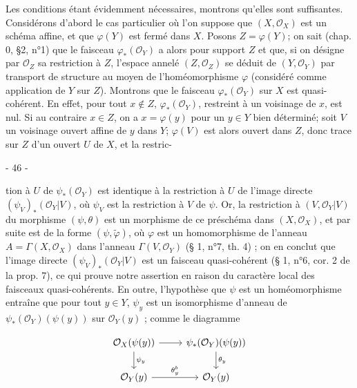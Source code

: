 Les conditions étant évidemment nécessaires, montrons qu'elles sont suffisantes. Considérons d'abord le cas particulier où l'on suppose que $(X, \mathcal{O}_X)$ est un schéma affine, et que $\varphi(Y)$ est fermé dans $X$. Posons $Z = \varphi(Y)$; on sait (chap. 0, §2, n°1) que le faisceau $\varphi_*(\mathcal{O}_Y)$ a alors pour support $Z$ et que, si on désigne par $\mathcal{O}_Z$ sa restriction à $Z$, l'espace annelé $(Z, \mathcal{O}_Z)$ se déduit de $(Y, \mathcal{O}_Y)$ par transport de structure au moyen de l'homéomorphisme $\varphi$ (considéré comme application de $Y$ sur $Z$). Montrons que le faisceau $\varphi_*(\mathcal{O}_Y)$ sur $X$ est quasi-cohérent. En effet, pour tout $x \notin Z$, $\varphi_*(\mathcal{O}_Y)$, restreint à un voisinage de $x$, est nul. Si au contraire $x \in Z$, on a $x = \varphi(y)$ pour un $y \in Y$ bien déterminé; soit $V$ un voisinage ouvert affine de $y$ dans $Y$; $\varphi(V)$ est alors ouvert dans $Z$, donc trace sur $Z$ d'un ouvert $U$ de $X$, et la restric-

\newpage


- 46 -

tion à $U$ de $\psi_*(\mathcal{O}_Y)$ est identique à la restriction à $U$ de l'image directe $(\psi_V)_*(\mathcal{O}_Y|V)$, où $\psi_V$ est la restriction à $V$ de $\psi$. Or, la restriction à $(V, \mathcal{O}_Y|V)$ du morphisme $(\psi, \theta)$ est un morphisme de ce préschéma dans $(X, \mathcal{O}_X)$, et par suite est de la forme $(\psi, \tilde{\varphi})$, où $\varphi$ est un homomorphisme de l'anneau $A = \Gamma(X, \mathcal{O}_X)$ dans l'anneau $\Gamma(V, \mathcal{O}_Y)$ (§ 1, n°7, th. 4) ; on en conclut que l'image directe $(\psi_V)_*(\mathcal{O}_Y|V)$ est un faisceau quasi-cohérent (§ 1, n°6, cor. 2 de la prop. 7), ce qui prouve notre assertion en raison du caractère local des faisceaux quasi-cohérents. En outre, l'hypothèse que $\psi$ est un homéomorphisme entraîne que pour tout $y \in Y$, $\psi_y$ est un isomorphisme d'anneau de $\psi_*(\mathcal{O}_Y)(\psi(y))$ sur $\mathcal{O}_Y(y)$ ; comme le diagramme

$$\begin{tikzcd}
\mathcal{O}_X(\psi(y)) \arrow[r] \arrow[d, "\psi_y"] & \psi_*(\mathcal{O}_Y)(\psi(y)) \arrow[d, "\theta_y"] \\
\mathcal{O}_Y(y) \arrow[r, "\theta_y^b"] & \mathcal{O}_Y(y)
\end{tikzcd}$$

